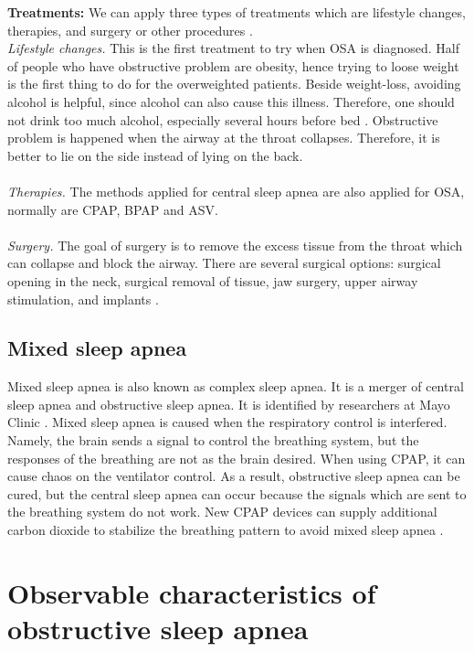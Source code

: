     \textbf{Treatments:} We can apply three types of treatments which are lifestyle changes, therapies, and surgery or other procedures \citep{MAYOCLINIC}.\\
    \textit{Lifestyle changes.}
    This is the first  treatment to try when OSA is diagnosed. Half of people who have obstructive problem are obesity, hence trying to loose weight is the first thing to do for the overweighted patients. Beside weight-loss, avoiding alcohol is helpful, since alcohol can also cause this illness. Therefore, one should not drink too much alcohol, especially several hours before bed \citep{MAYOCLINIC}. Obstructive problem is happened when the airway at the throat collapses. Therefore, it is better to lie on the side instead of lying on the back.\\\\
    \textit{Therapies.} The methods applied for central sleep apnea are also applied for OSA, normally are CPAP, BPAP and ASV.\\\\
    \textit{Surgery.}
    The goal of surgery is to remove the excess tissue from the throat which can collapse and block the airway. There are several surgical options: surgical opening in the neck, surgical removal of tissue, jaw surgery, upper airway stimulation, and implants \citep{MAYOCLINIC}.
\subsection{Mixed sleep apnea}
    Mixed sleep apnea is also known as complex sleep apnea. It is a merger of central sleep apnea and obstructive sleep apnea. It is identified by researchers at Mayo Clinic \citep{ScienceDaily}. Mixed sleep apnea is caused when the respiratory control is interfered. Namely, the brain sends a signal to control the breathing system, but the responses of the breathing are not as the brain desired. When using CPAP, it can cause chaos on the ventilator control. As a result, obstructive sleep apnea can be cured, but the central sleep apnea can occur because the signals which are sent to the breathing system do not work. New CPAP devices can supply additional carbon dioxide to stabilize the breathing pattern to avoid mixed sleep apnea \citep{Hindawi}.

\section{Observable characteristics of obstructive sleep apnea}

